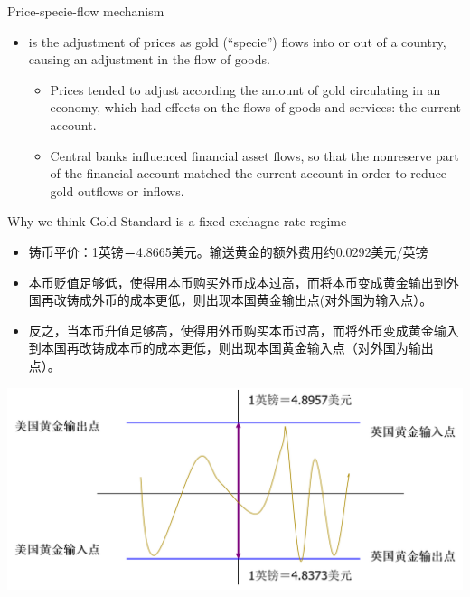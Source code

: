\documentclass[10pt,hyperref={CJKbookmarks=true},xcolor=dvipsnames,aspectratio=169]{beamer}
\begin{document}
\begin{frame}{Price-specie-flow mechanism}
\begin{itemize}
	\item {} is the adjustment
	of prices as gold (“specie”) flows into or out of a
	country, causing an adjustment in the flow of
	goods.
	\begin{itemize}
		\item  Prices tended to adjust according the amount of gold
		circulating in an economy, which had effects on the flows
		of goods and services: the current account.
		\item  Central banks influenced financial asset flows, so that the
		nonreserve part of the financial account matched the
		current account in order to reduce gold outflows or
		inflows.
	\end{itemize}
\end{itemize}
\end{frame}

\begin{frame}{Why we think Gold Standard is a fixed exchagne rate regime}
	\begin{itemize}
		\item 铸币平价：1英镑＝4.8665美元。输送黄金的额外费用约0.0292美元/英镑
		\item 本币贬值足够低，使得用本币购买外币成本过高，而将本币变成黄金输出到外国再改铸成外币的成本更低，则出现本国黄金输出点(对外国为输入点）。
		\item 反之，当本币升值足够高，使得用外币购买本币过高，而将外币变成黄金输入到本国再改铸成本币的成本更低，则出现本国黄金输入点（对外国为输出点）。
	\end{itemize}
		\centering
\includegraphics[scale=0.4]{fig/systems/specie}
\end{frame}
\end{document}
